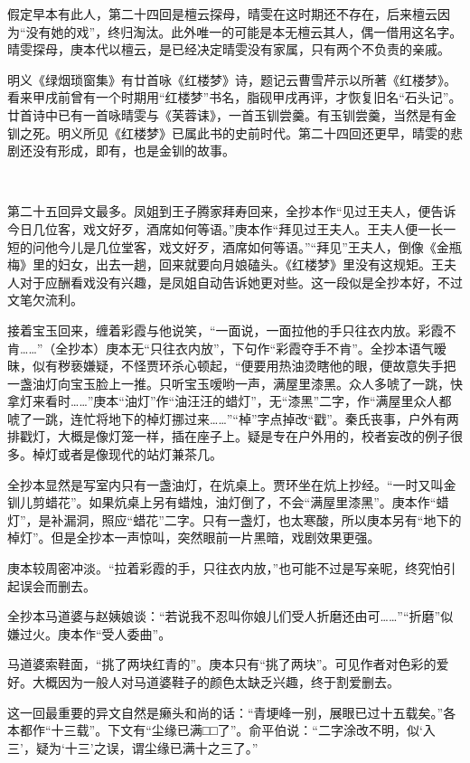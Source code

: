 \par 假定早本有此人，第二十四回是檀云探母，晴雯在这时期还不存在，后来檀云因为“没有她的戏”，终归淘汰。此外唯一的可能是本无檀云其人，偶一借用这名字。晴雯探母，庚本代以檀云，是已经决定晴雯没有家属，只有两个不负责的亲戚。
\par 明义《绿烟琐窗集》有廿首咏《红楼梦》诗，题记云曹雪芹示以所著《红楼梦》。看来甲戌前曾有一个时期用“红楼梦”书名，脂砚甲戌再评，才恢复旧名“石头记”。廿首诗中已有一首咏晴雯与《芙蓉诔》，一首玉钏尝羹。有玉钏尝羹，当然是有金钏之死。明义所见《红楼梦》已属此书的史前时代。第二十四回还更早，晴雯的悲剧还没有形成，即有，也是金钏的故事。
\par  
\par 第二十五回异文最多。凤姐到王子腾家拜寿回来，全抄本作“见过王夫人，便告诉今日几位客，戏文好歹，酒席如何等语。”庚本作“拜见过王夫人。王夫人便一长一短的问他今儿是几位堂客，戏文好歹，酒席如何等语。”“拜见”王夫人，倒像《金瓶梅》里的妇女，出去一趟，回来就要向月娘磕头。《红楼梦》里没有这规矩。王夫人对于应酬看戏没有兴趣，是凤姐自动告诉她更对些。这一段似是全抄本好，不过文笔欠流利。
\par 接着宝玉回来，缠着彩霞与他说笑，“一面说，一面拉他的手只往衣内放。彩霞不肯……”（全抄本）庚本无“只往衣内放”，下句作“彩霞夺手不肯”。全抄本语气暧昧，似有秽亵嫌疑，不怪贾环杀心顿起，“便要用热油烫瞎他的眼，便故意失手把一盏油灯向宝玉脸上一推。只听宝玉嗳哟一声，满屋里漆黑。众人多唬了一跳，快拿灯来看时……”庚本“油灯”作“油汪汪的蜡灯”，无“漆黑”二字，作“满屋里众人都唬了一跳，连忙将地下的棹灯挪过来……”“棹”字点掉改“戳”。秦氏丧事，户外有两排戳灯，大概是像灯笼一样，插在座子上。疑是专在户外用的，校者妄改的例子很多。棹灯或者是像现代的站灯兼茶几。
\par 全抄本显然是写室内只有一盏油灯，在炕桌上。贾环坐在炕上抄经。“一时又叫金钏儿剪蜡花”。如果炕桌上另有蜡烛，油灯倒了，不会“满屋里漆黑”。庚本作“蜡灯”，是补漏洞，照应“蜡花”二字。只有一盏灯，也太寒酸，所以庚本另有“地下的棹灯”。但是全抄本一声惊叫，突然眼前一片黑暗，戏剧效果更强。
\par 庚本较周密冲淡。“拉着彩霞的手，只往衣内放，”也可能不过是写亲昵，终究怕引起误会而删去。
\par 全抄本马道婆与赵姨娘谈：“若说我不忍叫你娘儿们受人折磨还由可……”“折磨”似嫌过火。庚本作“受人委曲”。
\par 马道婆索鞋面，“挑了两块红青的”。庚本只有“挑了两块”。可见作者对色彩的爱好。大概因为一般人对马道婆鞋子的颜色太缺乏兴趣，终于割爱删去。
\par 这一回最重要的异文自然是癞头和尚的话：“青埂峰一别，展眼已过十五载矣。”各本都作“十三载”。下文有“尘缘已满□□了”。俞平伯说：“二字涂改不明，似‘入三’，疑为‘十三’之误，谓尘缘已满十之三了。”
